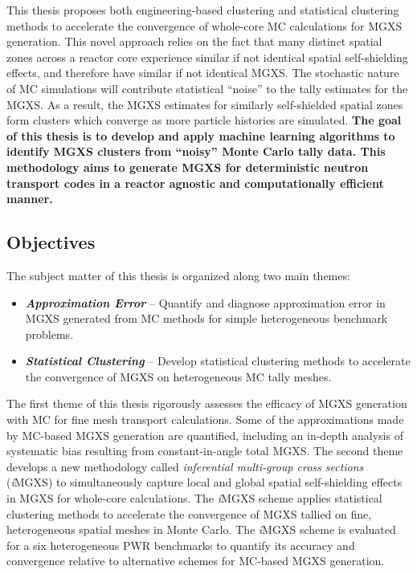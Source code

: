 \documentclass[12pt,twoside]{mitthesis-exec}
\begin{document}
This thesis proposes both engineering-based clustering and statistical clustering methods to accelerate the convergence of whole-core MC calculations for MGXS generation. This novel approach relies on the fact that many distinct spatial zones across a reactor core experience similar if not identical spatial self-shielding effects, and therefore have similar if not identical MGXS. The stochastic nature of MC simulations will contribute statistical ``noise'' to the tally estimates for the MGXS. As a result, the MGXS estimates for similarly self-shielded spatial zones form clusters which converge as more particle histories are simulated. \textbf{The goal of this thesis is to develop and apply machine learning algorithms to identify MGXS clusters from ``noisy'' Monte Carlo tally data. This methodology aims to generate MGXS for deterministic neutron transport codes in a reactor agnostic and computationally efficient manner.}

\subsection*{Objectives}

The subject matter of this thesis is organized along two main themes:

\begin{itemize}
\item \textbf{\textit{Approximation Error}} -- Quantify and diagnose approximation error in MGXS generated from MC methods for simple heterogeneous benchmark problems.
\item \textbf{\textit{Statistical Clustering}} -- Develop statistical clustering methods to accelerate the convergence of MGXS on heterogeneous MC tally meshes.
\end{itemize}

The first theme of this thesis rigorously assesses the efficacy of MGXS generation with MC for fine mesh transport calculations. Some of the approximations made by MC-based MGXS generation are quantified, including an in-depth analysis of systematic bias resulting from constant-in-angle total MGXS. The second theme develops a new methodology called \textit{inferential multi-group cross sections} (\textit{i}MGXS) to simultaneously capture local and global spatial self-shielding effects in MGXS for whole-core calculations. The \textit{i}MGXS scheme applies statistical clustering methods to accelerate the convergence of MGXS tallied on fine, heterogeneous spatial meshes in Monte Carlo. The \textit{i}MGXS scheme is evaluated for a six heterogeneous PWR benchmarks to quantify its accuracy and convergence relative to alternative schemes for MC-based MGXS generation.
\end{document}

